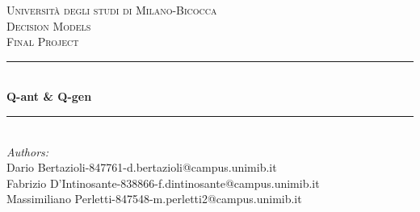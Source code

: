 \begin{titlepage}

\newcommand{\HRule}{\rule{\linewidth}{0.5mm}} %

\center %
 

\textsc{\LARGE Università degli studi di Milano-Bicocca}\\[1cm] %
\textsc{\Large Decision Models}\\[0.3cm] %
\textsc{\large Final Project}\\[0.1cm] %

\HRule \\[0.4cm]
{ \huge \bfseries Q-ant \& Q-gen}\\[0.4cm] %
\HRule \\[1.5cm]
 

\large
\emph{Authors:}\\
Dario Bertazioli-847761-d.bertazioli@campus.unimib.it \\   %
Fabrizio D'Intinosante-838866-f.dintinosante@campus.unimib.it \\
Massimiliano Perletti-847548-m.perletti2@campus.unimib.it\\[1cm] %



\end{titlepage}
